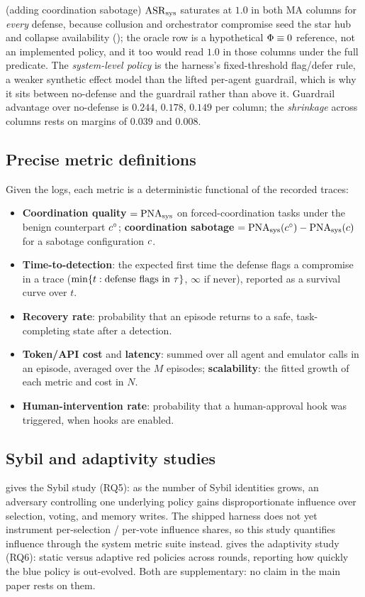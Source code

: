 \begin{table}[t]
{(adding coordination sabotage) $\mathrm{ASR}_{\mathrm{sys}}$ saturates at $1.0$ in both MA columns for \emph{every}
defense, because collusion and orchestrator compromise seed the star hub and collapse
availability (); the oracle row is a hypothetical
$\Phi\equiv0$ reference, not an implemented policy, and it too would read $1.0$ in those
columns under the full predicate. The \emph{system-level policy} is the harness's
fixed-threshold flag/defer rule, a weaker synthetic effect model than the lifted per-agent
guardrail, which is why it sits between no-defense and the guardrail rather than above it.
Guardrail advantage over no-defense is $0.244$, $0.178$, $0.149$ per column; the
\emph{shrinkage} across columns rests on margins of $0.039$ and $0.008$.}
\end{table}
\subsection{Precise metric definitions}
Given the \corb{} logs, each metric is a deterministic functional of the recorded traces:
\begin{itemize}[leftmargin=1.4em]
\item \textbf{Coordination quality} $=\mathrm{PNA}_{\mathrm{sys}}$ on forced-coordination tasks under the benign
counterpart $c^{\circ}$; \textbf{coordination sabotage} $=\mathrm{PNA}_{\mathrm{sys}}(c^{\circ})-\mathrm{PNA}_{\mathrm{sys}}(c)$
for a sabotage configuration $c$.
\item \textbf{Time-to-detection}: the expected first time the defense flags a compromise
in a trace ($\min\{t:\text{defense flags in }\tau\}$, $\infty$ if never), reported as a
survival curve over $t$.
\item \textbf{Recovery rate}: probability that an episode returns to a safe,
task-completing state after a detection.
\item \textbf{Token/API cost} and \textbf{latency}: summed over all agent and emulator calls
in an episode, averaged over the $M$ episodes; \textbf{scalability}: the fitted growth of each
metric and cost in $N$.
\item \textbf{Human-intervention rate}: probability that a human-approval hook was
triggered, when hooks are enabled.
\end{itemize}

\subsection{Sybil and adaptivity studies}
 gives the Sybil study (RQ5): as the number of Sybil identities grows, an
adversary controlling one underlying policy gains disproportionate influence over selection,
voting, and memory writes. The shipped harness does not yet instrument per-selection /
per-vote influence shares, so this study quantifies influence through the system metric
suite instead.  gives the adaptivity study (RQ6): static versus adaptive
red policies across \corb{} rounds, reporting how quickly the blue policy is out-evolved.
Both are supplementary: no claim in the main paper rests on them.


